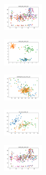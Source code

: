 \begin{figure}[H]
    \begin{subfigure}
        \centering
        \includegraphics[width=0.234\textwidth]{img/agesf/ecoli_set_const_10_277451237_clust.png}
    \end{subfigure}
    \hfill
    \begin{subfigure}
        \centering
        \includegraphics[width=0.234\textwidth]{img/agesf/rand_set_const_10_277451237_clust.png}
    \end{subfigure}
    \hfill
    \begin{subfigure}
        \centering
        \includegraphics[width=0.234\textwidth]{img/agesf/newthyroid_set_const_10_277451237_clust.png}
    \end{subfigure}
    \hfill
    \begin{subfigure}
        \centering
        \includegraphics[width=0.234\textwidth]{img/agesf/iris_set_const_10_49258669_clust.png}
    \end{subfigure}
    \hfill
    \begin{subfigure}
        \centering
        \includegraphics[width=0.234\textwidth]{img/agesf/ecoli_set_const_10_49258669_clust.png}
    \end{subfigure}
    \hfill
    \begin{subfigure}
        \centering

\end{subfigure}
\end{figure}

